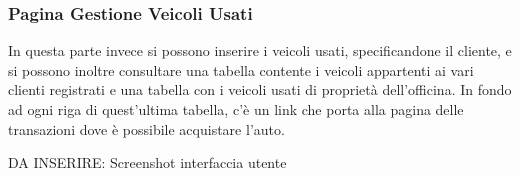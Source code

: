 \documentclass[a4paper,12pt]{report}
\begin{document}
\subsubsection*{Pagina Gestione Veicoli Usati}
In questa parte invece si possono inserire i veicoli usati, specificandone il cliente, e si possono inoltre 
%
consultare una tabella contente i veicoli appartenti ai vari clienti registrati e una tabella con i veicoli
%
usati di proprietà dell'officina. In fondo ad ogni riga di quest'ultima tabella, c'è un link che porta alla pagina
% 
delle transazioni dove è possibile acquistare l'auto.

DA INSERIRE: Screenshot interfaccia utente
\end{document}
